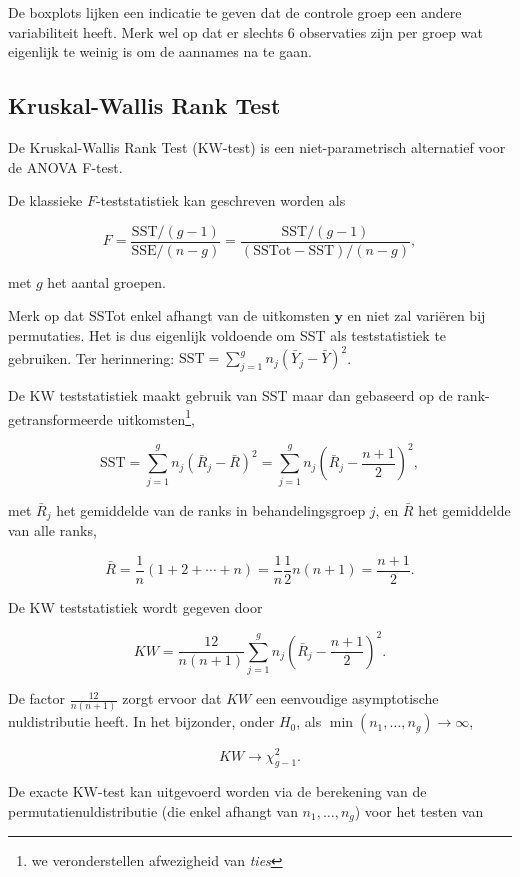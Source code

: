 \documentclass[
  dutch,
  letterpaper,
  12pt]{book}
\theoremstyle{definition}
\theoremstyle{definition}
\theoremstyle{definition}
\theoremstyle{remark}
\begin{document}
De boxplots lijken een indicatie te geven dat de controle groep een
andere variabiliteit heeft. Merk wel op dat er slechts 6 observaties
zijn per groep wat eigenlijk te weinig is om de aannames na te gaan.

\subsection{Kruskal-Wallis Rank Test}\label{kruskal-wallis-rank-test}

De Kruskal-Wallis Rank Test (KW-test) is een niet-parametrisch
alternatief voor de ANOVA F-test.

De klassieke \(F\)-teststatistiek kan geschreven worden als

\[F = \frac{\text{SST}/(g-1)}{\text{SSE}/(n-g)} = \frac{\text{SST}/(g-1)}{(\text{SSTot}-\text{SST})/(n-g)} ,\]

met \(g\) het aantal groepen.

Merk op dat SSTot enkel afhangt van de uitkomsten \(\mathbf{y}\) en niet
zal variëren bij permutaties. Het is dus eigenlijk voldoende om SST als
teststatistiek te gebruiken. Ter herinnering:
\(\text{SST}=\sum_{j=1}^g n_j(\bar{Y}_j-\bar{Y})^2\).

De KW teststatistiek maakt gebruik van SST maar dan gebaseerd op de
rank-getransformeerde uitkomsten\footnote{we veronderstellen afwezigheid
  van \emph{ties}},

\[\text{SST} = \sum_{j=1}^g n_j \left(\bar{R}_j - \bar{R}\right)^2 = \sum_{j=1}^g n_j \left(\bar{R}_j - \frac{n+1}{2}\right)^2 ,\]

met \(\bar{R}_j\) het gemiddelde van de ranks in behandelingsgroep
\(j\), en \(\bar{R}\) het gemiddelde van alle ranks,

\[\bar{R} = \frac{1}{n}(1+2+\cdots + n) = \frac{1}{n}\frac{1}{2}n(n+1) = \frac{n+1}{2}.\]

De KW teststatistiek wordt gegeven door

\[KW = \frac{12}{n(n+1)}  \sum_{j=1}^g n_j \left(\bar{R}_j - \frac{n+1}{2}\right)^2.\]

De factor \(\frac{12}{n(n+1)}\) zorgt ervoor dat \(KW\) een eenvoudige
asymptotische nuldistributie heeft. In het bijzonder, onder \(H_0\), als
\(\min(n_1,\ldots, n_g)\rightarrow \infty\),

\[KW  \rightarrow \chi^2_{g-1}.\]

De exacte KW-test kan uitgevoerd worden via de berekening van de
permutatienuldistributie (die enkel afhangt van \(n_1, \ldots, n_g\))
voor het testen van
\end{document}
